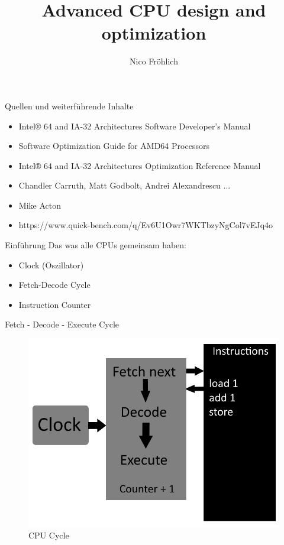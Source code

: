 \documentclass[11pt]{beamer}
\author{Nico Fröhlich}
\title{Advanced CPU design and optimization}
\institute{Troblecodings}
\begin{document}
\begin{frame}
    \titlepage
\end{frame}

\begin{frame}{Quellen und weiterführende Inhalte}
    \begin{itemize}
        \item Intel® 64 and IA-32 Architectures Software Developer’s Manual
        \item Software Optimization Guide for AMD64 Processors
        \item Intel® 64 and IA-32 Architectures Optimization Reference Manual
        \item Chandler Carruth, Matt Godbolt, Andrei Alexandrescu ...
        \item Mike Acton
        \item https://www.quick-bench.com/q/Ev6U1Owr7WKTbzyNgCol7vEJq4o
    \end{itemize}
\end{frame}

\begin{frame}{Einführung}
Das was alle CPUs gemeinsam haben:
    \begin{itemize}
        \item Clock (Oszillator)
        \item Fetch-Decode Cycle
        \item Instruction Counter
    \end{itemize}
\end{frame}

\begin{frame}{Fetch - Decode - Execute Cycle}
\begin{figure}[hbtp]
\centering
\includegraphics[scale=.4]{cpucycle.png}
\caption{CPU Cycle}
\end{figure}
\end{frame}
\end{document}
